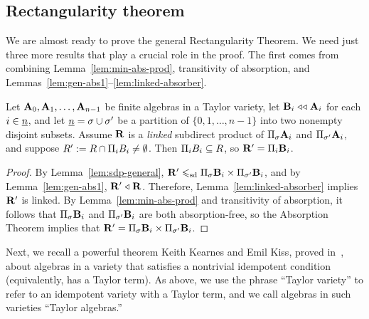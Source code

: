 %

\subsection{Rectangularity theorem}
\label{sec:rect-theor}
We are almost ready to prove the general Rectangularity Theorem.
We need just three more results that play a crucial role in the proof.
The first comes from combining Lemma~\ref{lem:min-abs-prod}, transitivity of absorption, and 
Lemmas~\ref{lem:gen-abs1}--\ref{lem:linked-absorber}.
\begin{lemma}
\label{lem:general-linked}
Let $\mathbf{A}_0, \mathbf{A}_1, \dots, \mathbf{A}_{n-1}$ 
be finite algebras in a Taylor variety, 
let $\mathbf{B}_i\mathrel{\triangleleft\triangleleft} \mathbf{A}_i$ for each $i\in \underline{n} $, 
and let $\underline{n}  = \sigma \cup {\sigma'}$ be a partition of 
$\{0, 1, \dots, n-1\}$ into two nonempty disjoint subsets.
Assume
$\mathbf{R}$ is a \emph{linked} subdirect product of 
$\Pi_{\sigma} \mathbf{A}_i$ and $\Pi_{\sigma'}\mathbf{A}_i$, and
suppose $R' := R \cap \Pi_i B_i \neq \emptyset$.
Then $\Pi_i B_i\subseteq R$, so $\mathbf{R}' = \Pi_i \mathbf{B}_i$.
\end{lemma}
\begin{proof}
  By Lemma~\ref{lem:sdp-general}, $\mathbf{R}' \leqslant_{\mathrm{sd}} \Pi_\sigma \mathbf{B}_i \times \Pi_{\sigma'} \mathbf{B}_i$, and
  by Lemma~\ref{lem:gen-abs1}, $\mathbf{R}' \mathrel{\triangleleft} \mathbf{R}$.
  Therefore, Lemma~\ref{lem:linked-absorber} implies $\mathbf{R}'$ is linked. 
  By Lemma~\ref{lem:min-abs-prod} and transitivity of absorption, it follows that
  $\Pi_{\sigma} \mathbf{B}_i$ and $\Pi_{\sigma'} \mathbf{B}_i$ are both absorption-free, so the Absorption
  Theorem %
implies that $\mathbf{R}' = \Pi_{\sigma}\mathbf{B}_i \times \Pi_{\sigma'}\mathbf{B}_i$.
\end{proof}


Next, we recall a powerful theorem Keith Kearnes and Emil Kiss, proved in~\cite{MR3076179}, 
about algebras in a variety that satisfies a nontrivial idempotent \malcev condition (equivalently,
has a Taylor term).
As above, we use the phrase ``Taylor variety'' to refer to an idempotent variety
with a Taylor term, and we call algebras in such varieties ``Taylor algebras.''


